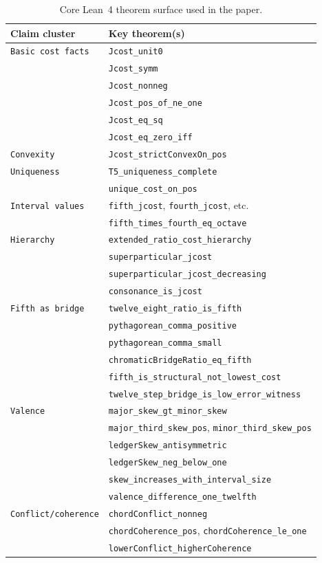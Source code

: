 \documentclass[11pt,a4paper]{article}
\begin{document}
\begin{table}[H]
\centering
\small
\caption{Core Lean~4 theorem surface used in the paper.}
\label{tab:lean}
\begin{tabular}{@{}ll@{}}
\toprule
Claim cluster & Key theorem(s) \\
\midrule
\texttt{Basic cost facts}
  & \texttt{Jcost\_unit0} \\
  & \texttt{Jcost\_symm} \\
  & \texttt{Jcost\_nonneg} \\
  & \texttt{Jcost\_pos\_of\_ne\_one} \\
  & \texttt{Jcost\_eq\_sq} \\
  & \texttt{Jcost\_eq\_zero\_iff} \\
\texttt{Convexity}
  & \texttt{Jcost\_strictConvexOn\_pos} \\
\texttt{Uniqueness}
  & \texttt{T5\_uniqueness\_complete} \\
  & \texttt{unique\_cost\_on\_pos} \\
\texttt{Interval values}
  & \texttt{fifth\_jcost}, \texttt{fourth\_jcost}, etc. \\
  & \texttt{fifth\_times\_fourth\_eq\_octave} \\
\texttt{Hierarchy}
  & \texttt{extended\_ratio\_cost\_hierarchy} \\
  & \texttt{superparticular\_jcost} \\
  & \texttt{superparticular\_jcost\_decreasing} \\
  & \texttt{consonance\_is\_jcost} \\
\texttt{Fifth as bridge}
  & \texttt{twelve\_eight\_ratio\_is\_fifth} \\
  & \texttt{pythagorean\_comma\_positive} \\
  & \texttt{pythagorean\_comma\_small} \\
  & \texttt{chromaticBridgeRatio\_eq\_fifth} \\
  & \texttt{fifth\_is\_structural\_not\_lowest\_cost} \\
  & \texttt{twelve\_step\_bridge\_is\_low\_error\_witness} \\
\texttt{Valence}
  & \texttt{major\_skew\_gt\_minor\_skew} \\
  & \texttt{major\_third\_skew\_pos}, \texttt{minor\_third\_skew\_pos} \\
  & \texttt{ledgerSkew\_antisymmetric} \\
  & \texttt{ledgerSkew\_neg\_below\_one} \\
  & \texttt{skew\_increases\_with\_interval\_size} \\
  & \texttt{valence\_difference\_one\_twelfth} \\
\texttt{Conflict/coherence}
  & \texttt{chordConflict\_nonneg} \\
  & \texttt{chordCoherence\_pos}, \texttt{chordCoherence\_le\_one} \\
  & \texttt{lowerConflict\_higherCoherence} \\
\bottomrule
\end{tabular}
\end{table}
\end{document}
